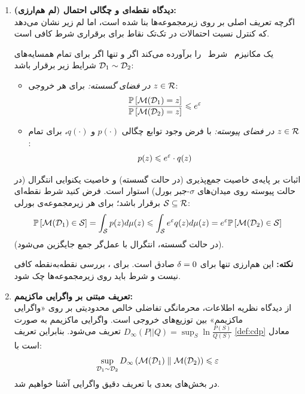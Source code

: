 \begin{enumerate}
    \item \textbf{دیدگاه نقطه‌ای و چگالی احتمال (لم هم‌ارزی):}\\
    اگرچه تعریف اصلی بر روی زیرمجموعه‌ها بنا شده است، اما لم زیر نشان می‌دهد که کنترل نسبت احتمالات در تک‌تک نقاط برای برقراری شرط کافی است.

    \begin{لم}
    \label{lem:pointwise-dp}
    یک مکانیزم \mech \ شرط \DP\ را برآورده می‌کند اگر و تنها اگر برای تمام همسایه‌های $\Dset[1] \sim \Dset[2]$ شرایط زیر برقرار باشد:
    \begin{itemize}
        \item \textit{در فضای گسسته:} برای هر خروجی $z \in \Rset$:
        \begin{equation}
        \frac{\mathbb{P}\left[ \mech(\Dset[1]) = z \right]}{\mathbb{P}\left[ \mech(\Dset[2]) = z \right]} \le e^\eps
        \end{equation}
        \item \textit{در فضای پیوسته:} با فرض وجود توابع چگالی $p(\cdot)$ و $q(\cdot)$، برای تمام $z \in \Rset$:
        \begin{equation}
        \label{eq:dp-pdf}
        p(z) \leqslant e^{\varepsilon} \cdot q(z)
        \end{equation}
    \end{itemize}
    \end{لم}

    \begin{اثبات}
    اثبات بر پایه‌ی خاصیت جمع‌پذیری (در حالت گسسته) و خاصیت یکنوایی انتگرال (در حالت پیوسته روی میدان‌های $\sigma$-جبر بورل) استوار است. فرض کنید شرط نقطه‌ای برقرار باشد؛ برای هر زیرمجموعه‌ی بورلی $\Sset \subseteq \Rset$:
    \[
    \mathbb{P}\left[ \mech(\Dset[1]) \in \Sset \right] = \int_{\Sset} p(z) d\mu(z) \le \int_{\Sset} e^\eps q(z) d\mu(z) = e^\eps \mathbb{P}\left[ \mech(\Dset[2]) \in \Sset \right]
    \]
    (در حالت گسسته، انتگرال با عمل‌گر جمع جایگزین می‌شود).
    \end{اثبات}
    
    \textbf{نکته:} این هم‌ارزی تنها برای $\delta=0$ صادق است. برای \DP[(\eps, \del)]، بررسی نقطه‌به‌نقطه کافی نیست و شرط باید روی زیرمجموعه‌ها چک شود.

    \item \textbf{تعریف مبتنی بر واگرایی ماکزیمم:}\\
    از دیدگاه نظریه اطلاعات، محرمانگی تفاضلی خالص محدودیتی بر روی «واگرایی ماکزیمم» بین توزیع‌های خروجی است. واگرایی ماکزیمم به صورت $D_\infty(P || Q) = \sup_{S} \ln \frac{P(S)}{Q(S)}$ تعریف می‌شود. بنابراین تعریف \ref{def:cdp} معادل است با:
    \begin{equation}
    \label{eq:dp-max-div}
    \sup_{\Dset[1] \sim \Dset[2]} D_\infty\left( \mech(\Dset[1]) \parallel \mech(\Dset[2]) \right) \le \eps
    \end{equation}
    در بخش‌های بعدی با تعریف دقیق واگرایی آشنا خواهیم شد.
\end{enumerate}

